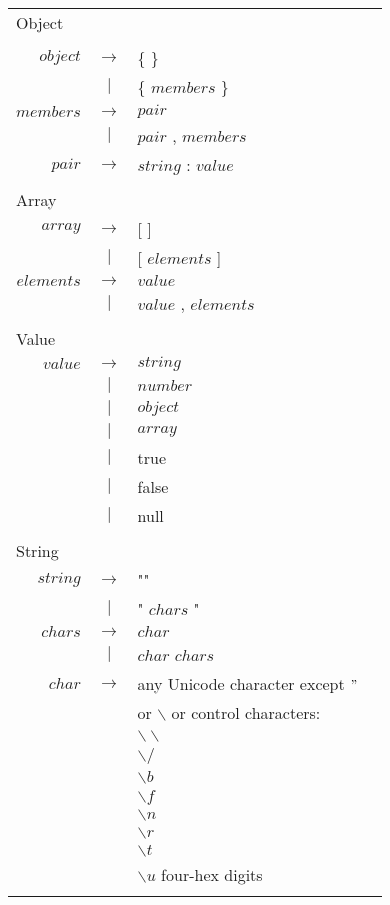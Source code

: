 \documentclass{article}
\begin{document}
\begin{footnotesize}
\begin{longtable}{ r c l r }

\multicolumn{4}{l}{Object}		\\
\\[0.01in]
$object$	& $ \rightarrow $ 	& \{ \}					& \\
 		& $ | $			& \{ $members$ \} 			& \\
$members$ 	& $ \rightarrow $	& $pair$				& \\
		& $ | $			& $pair$ , $members$ 			& \\
$pair$		& $ \rightarrow $	& $string$ : $value$ 			& \\
\\[0.01in]

\multicolumn{4}{l}{Array}		\\
$array$		& $ \rightarrow $	& [ ]					& \\
		& $ | $			& [ $elements$ ]			& \\
$elements$ 	& $ \rightarrow $	& $value$				& \\
		& $ | $			& $value$ , $elements$			& \\
\\[0.01in]

\multicolumn{4}{l}{Value}		\\
$value$		& $ \rightarrow $	& $string$				& \\
		& $ | $			& $number$				& \\
		& $ | $			& $object$				& \\
		& $ | $			& $array$				& \\
		& $ | $			& true					& \\
		& $ | $			& false					& \\
		& $ | $			& null					& \\
\\[0.01in]

\multicolumn{4}{l}{String}		\\
$string$	& $ \rightarrow $	& ""					& \\
		& $ | $			& " $chars$ "				& \\
$chars$		& $ \rightarrow $	& $char$				& \\
		& $ | $			& $char$ $chars$			& \\
$char$		& $ \rightarrow $	& any Unicode character except $"$ 	& \\ 
		&			& or $\backslash$ or control characters: & \\
		&			& $\backslash\backslash$		& \\
		&			& $\backslash /$ 			& \\
		&			& $\backslash b$ 			& \\
		& 			& $\backslash f$ 			& \\
		&			& $\backslash n$			& \\
		& 			& $\backslash r$ 			& \\
		&			& $\backslash t$ 			& \\
		& 			& $\backslash u$ four-hex digits\\
\\[0.01in]


\end{longtable}
\end{footnotesize}
\end{document}
